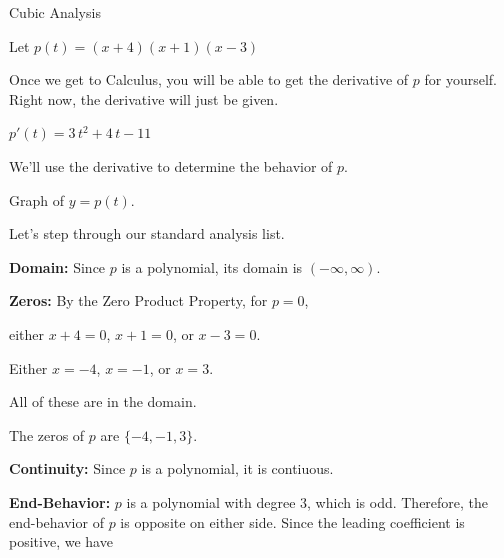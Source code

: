 \documentclass{ximera}
\begin{document}
\begin{example} Cubic Analysis


Let $p(t) = (x+4)(x+1)(x-3)$

Once we get to Calculus, you will be able to get the derivative of $p$ for yourself. Right now, the derivative will just be given.

$p'(t) = 3 \, t^2 + 4 \, t - 11$

We'll use the derivative to determine the behavior of $p$.


Graph of $y = p(t)$.

\begin{image}
\end{image}

Let's step through our standard analysis list.




\textbf{Domain:} Since $p$ is a polynomial, its domain is $(-\infty, \infty)$.


\textbf{Zeros:} By the Zero Product Property, for $p = 0$, 

either $x+4=0$, $x+1=0$, or $x-3=0$.


Either $x=-4$, $x=-1$, or $x=3$.

All of these are in the domain.


The zeros of $p$ are $\{ -4, -1, 3 \}$.


\textbf{Continuity:} Since $p$ is a polynomial, it is contiuous.


\textbf{End-Behavior:} $p$ is a polynomial with degree $3$, which is odd. Therefore, the end-behavior of $p$ is opposite on either side.  Since the leading coefficient is positive, we have



\end{example}
\end{document}

